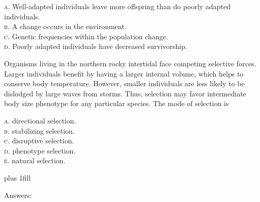 \documentclass[letterpaper]{tufte-handout}
\begin{document}
\smallskip

\noindent \textsc{a}. Well-adapted individuals leave more offspring than do poorly adapted individuals.\\
\noindent \textsc{b}. A change occurs in the environment.\\
\noindent \textsc{c}. Genetic frequencies within the population change.\\
\noindent \textsc{d}. Poorly adapted individuals have decreased survivorship.\\

\bigskip

\noindent Organisms living in the northern rocky intertidal face competing selective forces. Larger individuals benefit by having a larger internal volume, which helps to conserve body temperature. However, smaller individuals are less likely to be dislodged by large waves from storms. Thus, selection may favor intermediate body size phenotype for any particular species. The mode of selection is

\smallskip

\textsc{a}. directional selection.\\
\textsc{b}. stabilizing selection. \\
\textsc{c}. disruptive selection. \\
\textsc{d}. phenotype selection. \\
\textsc{e}. natural selection.

%
%

\vskip0pt plus 1fill

\hfill Answers: 
\end{document}

